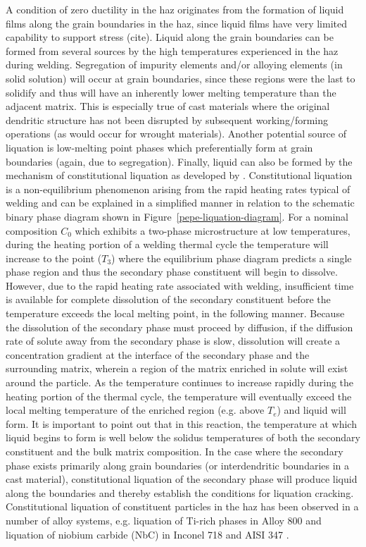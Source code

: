 A condition of zero ductility in the \gls{haz} originates from the formation of liquid films along the grain boundaries in the \gls{haz}, since liquid films have very limited capability to support stress (cite). Liquid along the grain boundaries can be formed from several sources by the high temperatures experienced in the \gls{haz} during welding. Segregation of impurity elements and/or alloying elements (in solid solution) will occur at grain boundaries, since these regions were the last to solidify and thus will have an inherently lower melting temperature than the adjacent matrix. This is especially true of cast materials where the original dendritic structure has not been disrupted by subsequent working/forming operations (as would occur for wrought materials). Another potential source of liquation is low-melting point phases which preferentially form at grain boundaries (again, due to segregation). Finally, liquid can also be formed by the mechanism of constitutional liquation as developed by \citet{pepe_effects_1967}. Constitutional liquation is a non-equilibrium phenomenon arising from the rapid heating rates typical of welding and can be explained in a simplified manner in relation to the schematic binary phase diagram shown in Figure~\ref{pepe-liquation-diagram}. For a nominal composition $C_0$ which exhibits a two-phase microstructure at low temperatures, during the heating portion of a welding thermal cycle the temperature will increase to the point ($T_3$) where the equilibrium phase diagram predicts a single phase region and thus the secondary phase constituent will begin to dissolve. However, due to the rapid heating rate associated with welding, insufficient time is available for complete dissolution of the secondary constituent before the temperature exceeds the local melting point, in the following manner. Because the dissolution of the secondary phase must proceed by diffusion, if the diffusion rate of solute away from the secondary phase is slow, dissolution will create a concentration gradient at the interface of the secondary phase and the surrounding matrix, wherein a region of the matrix enriched in solute will exist around the particle. As the temperature continues to increase rapidly during the heating portion of the thermal cycle, the temperature will eventually exceed the local melting temperature of the enriched region (e.g. above $T_e$) and liquid will form. It is important to point out that in this reaction, the temperature at which liquid begins to form is well below the solidus temperatures of both the secondary constituent and the bulk matrix composition. In the case where the secondary phase exists primarily along grain boundaries (or interdendritic boundaries in a cast material), constitutional liquation of the secondary phase will produce liquid along the boundaries and thereby establish the conditions for liquation cracking. Constitutional liquation of constituent particles in the \gls{haz} has been observed in a number of alloy systems, e.g. liquation of Ti-rich phases in Alloy 800 \cite{lippold_investigation_1983} and liquation of niobium carbide (NbC) in Inconel 718 \cite{radhakrishnan_phase_1991} and AISI 347 \cite{lee_weldability_1988}.

